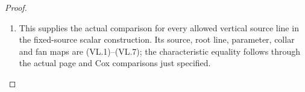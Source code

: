 \begin{proof}
\begin{enumerate}[label=\arabic*.]
\item This supplies the actual comparison for every
allowed vertical source line in the fixed-source
scalar construction. Its source, root line,
parameter, collar and fan maps are (VL.1)--(VL.7);
the characteristic equality follows through the
actual page and Cox comparisons just specified.

\end{enumerate}
\end{proof}